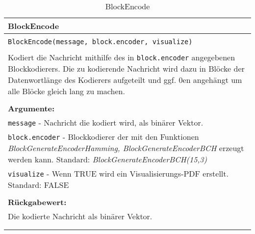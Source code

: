 \begin{longtable}{|p{\textwidth}|}
\hline
\rowcolor{lightblue}BlockEncode\\
\hline
\\
\texttt{BlockEncode(message, block.encoder, visualize)}\\
\\
Kodiert die Nachricht mithilfe des in \texttt{block.encoder} angegebenen Blockkodierers. Die zu kodierende Nachricht wird dazu in Blöcke der Datenwortlänge des Kodierers aufgeteilt und ggf. 0en angehängt um alle Blöcke gleich lang zu machen. \\
\\
\textbf{Argumente:}\\
\texttt{message} - Nachricht die kodiert wird, als binärer Vektor.\\
\texttt{block.encoder} - Blockkodierer der mit den Funktionen \emph{BlockGenerateEncoderHamming, BlockGenerateEncoderBCH} erzeugt werden kann. Standard: \emph{BlockGenerateEncoderBCH(15,3)}\\
\texttt{visualize} - Wenn TRUE wird ein Visualisierungs-PDF erstellt. Standard: FALSE\\
\\
\textbf{Rückgabewert:}\\
Die kodierte Nachricht als binärer Vektor.\\
\\
\hline
\caption{BlockEncode}
\end{longtable}
